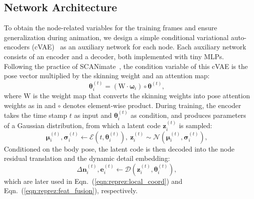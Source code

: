 \subsection{Network Architecture}
\label{sec:method:arch}
To obtain the node-related variables for the training frames and ensure generalization during animation, we design a simple conditional variational auto-encoders (cVAE)~\cite{Sohn2015cvae} as an auxiliary network for each node. 
Each auxiliary network consists of an encoder and a decoder, both implemented with tiny MLPs. 
Following the practice of SCANimate~\cite{Saito:SCANimate:2021}, the condition variable of this cVAE is the pose vector multiplied by the skinning weight and an attention map:
\begin{equation}
    \bm{\theta}^{(t)}_i = (\bm{\mathrm{W}}\cdot \bm{\omega}_i) \circ \bm{\theta}^{(t)}, 
\end{equation}
where $\bm{\mathrm{W}}$ is the weight map that converts the skinning weights into pose attention weights as in \cite{Saito:SCANimate:2021} and $\circ$ denotes element-wise product. 
During training, the encoder takes the time stamp $t$ as input and $\bm{\theta}^{(t)}_i$ as condition, and produces parameters of a Gaussian distribution, from which a latent code $\bm{z}_i^{(t)}$ is sampled:
\begin{equation}
\label{eqn:latent_sample}
    \bm{\mu}_i^{(t)}, \bm{\sigma}_i^{(t)} \gets \mathcal{E}(t, \bm{\theta}_i^{(t)}), \ \bm{z}_i^{(t)} \sim \mathcal{N}(\bm{\mu}_i^{(t)}, \bm{\sigma}_i^{(t)}), 
\end{equation}
Conditioned on the body pose, the latent code is then decoded into the node residual translation and the dynamic detail embedding:
\begin{equation}
    \Delta\bm{n}_i^{(t)},  \bm{e}_i^{(t)} \gets \mathcal{D}(\bm{z}_i^{(t)}, \bm{\theta}_i^{(t)}), 
\end{equation}
which are later used in Eqn.~(\ref{eqn:reprez:local_coord}) and  Eqn.~(\ref{eqn:reprez:feat_fusion}), respectively. 

